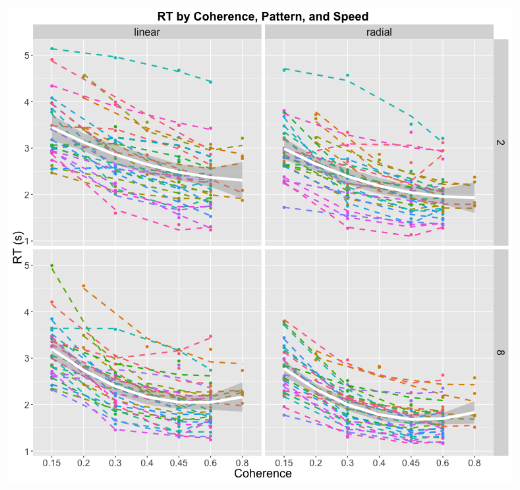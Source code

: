 \documentclass[landscape,final,a0paper,fontscale=0.285]{baposter}
\begin{document}
\begin{poster}
{\begin{center}
        \includegraphics[scale=0.3]{img/plot-rt-2.png}
      \end{center}
    }




\end{poster}
\end{document}
